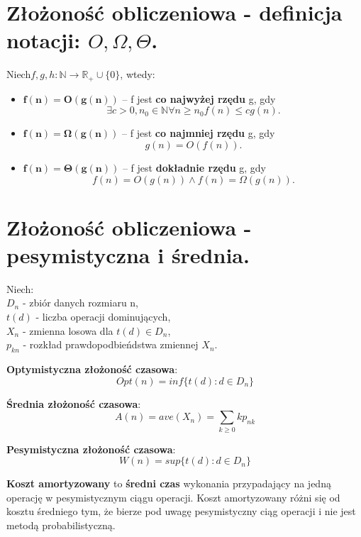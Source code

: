 \documentclass[main.tex]{subfiles}
\begin{document}
    \section{Złożoność obliczeniowa - definicja notacji: $O, \Omega, \Theta$.}
    \begin{definition}
        Niech$f, g, h: \mathbb{N} \rightarrow \mathbb{R}_{+} \cup \{0\}$, wtedy:
        \begin{itemize}
            \item $\mathbf{f(n) = O(g(n))}$ -- f jest \textbf{co najwyżej rzędu} g, gdy
            \[\exists c > 0, n_0 \in \mathbb{N} \forall n \geq n_0 f(n) \leq cg(n).\]
            \item $\mathbf{f(n) = \Omega(g(n))}$ -- f jest \textbf{co najmniej rzędu} g, gdy
            \[g(n) = O(f(n)).\]
            \item $\mathbf{f(n) = \Theta(g(n))}$ -- f jest \textbf{dokładnie rzędu} g, gdy
            \[f(n) = O(g(n)) \wedge  f(n) = \Omega(g(n)).\]
        \end{itemize}
    \end{definition}


    \section{Złożoność obliczeniowa - pesymistyczna i średnia.}

    \begin{definition}
        Niech:\\
        $D_n$ - zbiór danych rozmiaru n,\\
        $t(d)$ - liczba operacji dominujących,\\
        $X_n$ - zmienna losowa dla $t(d) \in D_n$,\\
        $p_{kn}$ - rozkład prawdopodbieńdstwa zmiennej $X_n$.

        \textbf{Optymistyczna złożoność czasowa}:
        \[Opt(n) = inf\{t(d) : d \in D_n\}\]

        \textbf{Średnia złożoność czasowa}:
        \[A(n) = ave(X_n) = \sum_{k \geq 0}kp_{nk}\]

        \textbf{Pesymistyczna złożoność czasowa}:
        \[W(n) = sup\{t(d) : d \in D_n\}\]
    \end{definition}

    \begin{definition}
        \textbf{Koszt amortyzowany} to \textbf{średni czas} wykonania przypadający na jedną operację w pesymistycznym
        ciągu operacji. Koszt amortyzowany różni się od kosztu średniego tym, że bierze pod uwagę pesymistyczny ciąg
        operacji i nie jest metodą probabilistyczną.
    \end{definition}
\end{document}
